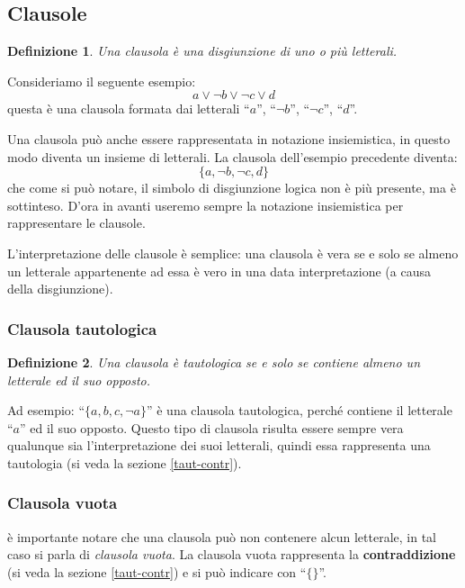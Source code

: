 \documentclass[a4paper,12pt]{report}
\newtheorem{definition}{Definizione}[section]
\begin{document}
\subsection{Clausole}
\begin{definition}
    Una clausola è una disgiunzione di uno o più letterali.
\end{definition}
Consideriamo il seguente esempio:
\[ a \lor \lnot b \lor \lnot c \lor d \] 
questa è una clausola formata dai letterali ``$a$'', ``$\lnot b$'', ``$\lnot c$'', ``$d$''.

Una clausola può anche essere rappresentata in notazione insiemistica, in questo modo diventa un insieme di letterali. La clausola dell'esempio precedente diventa:
\[ \{a, \lnot b, \lnot c, d\}\]
che come si può notare, il simbolo di disgiunzione logica non è più presente, ma è sottinteso. D'ora in avanti useremo sempre la notazione insiemistica per rappresentare le clausole.

L'interpretazione delle clausole è semplice: una clausola è vera se e solo se almeno un letterale appartenente ad essa è vero in una data interpretazione (a causa della disgiunzione).

\subsubsection{Clausola tautologica}
\begin{definition}
    Una clausola è tautologica se e solo se contiene almeno un letterale ed il suo opposto.
\end{definition}
Ad esempio: ``$\{ a, b, c, \lnot a \}$'' è una clausola tautologica, perché contiene il letterale ``$a$'' ed il suo opposto. Questo tipo di clausola risulta essere sempre vera qualunque sia l'interpretazione dei suoi letterali, quindi essa rappresenta una tautologia (si veda la sezione \ref{taut-contr}).

\subsubsection{Clausola vuota}
è importante notare che una clausola può non contenere alcun letterale, in tal caso si parla di \emph{clausola vuota}. La clausola vuota rappresenta la \textbf{contraddizione} (si veda la sezione \ref{taut-contr}) e si può indicare con ``$\{ \}$''.
\end{document}

